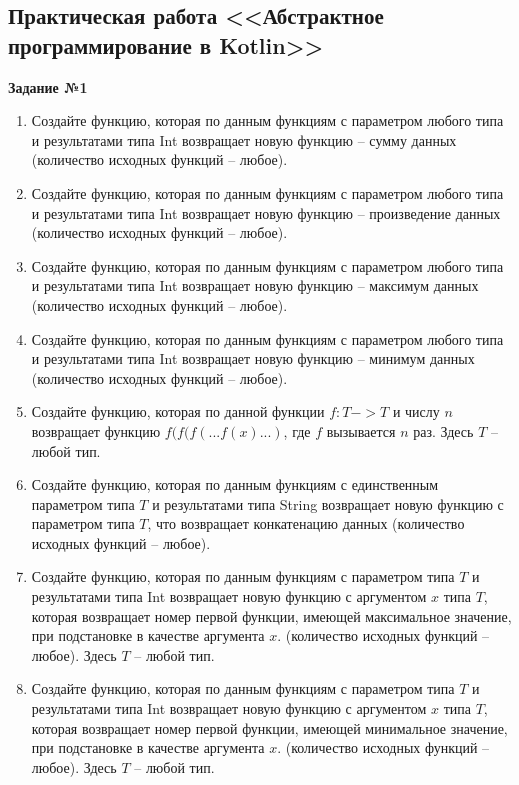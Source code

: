 \subsection{Практическая работа <<Абстрактное программирование в Kotlin>>}

\textbf{Задание №1}

\begin{enumerate}
	\item Создайте функцию, которая по данным функциям с параметром любого типа и результатами типа Int возвращает новую функцию -- сумму данных 
		(количество исходных функций -- любое).
	\item Создайте функцию, которая по данным функциям с параметром любого типа и результатами типа Int возвращает новую функцию -- произведение данных
		(количество исходных функций -- любое).
	\item Создайте функцию, которая по данным функциям с параметром любого типа и результатами типа Int возвращает новую функцию -- максимум данных
		(количество исходных функций -- любое).
  	\item Создайте функцию, которая по данным функциям с параметром любого типа и результатами типа Int возвращает новую функцию -- минимум данных
		(количество исходных функций -- любое).
	\item Создайте функцию, которая по данной функции $f:T->T$ и числу $n$ возвращает функцию $f(f(f(...f(x)...)$, где $f$ вызывается $n$ раз. Здесь $T$ -- любой тип.
  	\item Создайте функцию, которая по данным функциям с единственным параметром типа $T$ и результатами типа String возвращает 
		новую функцию с параметром типа $T$, что возвращает конкатенацию данных (количество исходных функций -- любое).
	\item Создайте функцию, которая по данным функциям с параметром типа $T$ и результатами типа Int возвращает новую функцию с аргументом $x$ типа $T$,
		которая возвращает номер первой функции, имеющей максимальное значение, при подстановке в качестве аргумента $x$.
		(количество исходных функций -- любое). Здесь $T$ -- любой тип.
	\item Создайте функцию, которая по данным функциям с параметром типа $T$ и результатами типа Int возвращает новую функцию с аргументом $x$ типа $T$,
		которая возвращает номер первой функции, имеющей минимальное значение, при подстановке в качестве аргумента $x$.
		(количество исходных функций -- любое). Здесь $T$ -- любой тип.


\end{enumerate}
